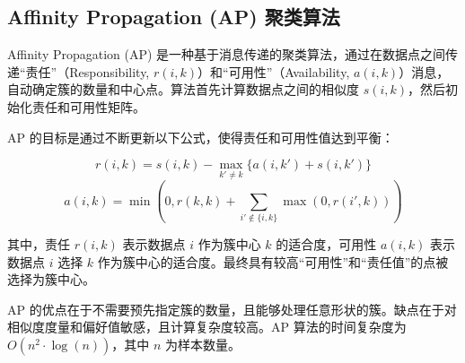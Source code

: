 \documentclass{ctexart} %
\begin{document}
\subsection{Affinity Propagation (AP) 聚类算法}

Affinity Propagation (AP) 是一种基于消息传递的聚类算法，通过在数据点之间传递“责任”（Responsibility, \(r(i, k)\)）和“可用性”（Availability, \(a(i, k)\)）消息，自动确定簇的数量和中心点。算法首先计算数据点之间的相似度 \(s(i, k)\)，然后初始化责任和可用性矩阵。

AP 的目标是通过不断更新以下公式，使得责任和可用性值达到平衡：

\[
r(i, k) = s(i, k) - \max_{k' \neq k} \{a(i, k') + s(i, k')\}
\]
\[
a(i, k) = \min\left(0, r(k, k) + \sum_{i' \notin \{i, k\}} \max(0, r(i', k))\right)
\]

其中，责任 \(r(i, k)\) 表示数据点 \(i\) 作为簇中心 \(k\) 的适合度，可用性 \(a(i, k)\) 表示数据点 \(i\) 选择 \(k\) 作为簇中心的适合度。最终具有较高“可用性”和“责任值”的点被选择为簇中心。

AP 的优点在于不需要预先指定簇的数量，且能够处理任意形状的簇。缺点在于对相似度度量和偏好值敏感，且计算复杂度较高。AP 算法的时间复杂度为 \(O(n^2 \cdot \log(n))\)，其中 \(n\) 为样本数量。
\end{document}
